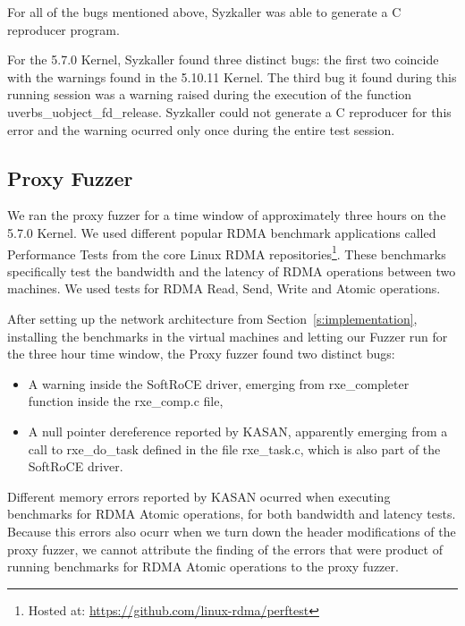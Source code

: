 For all of the bugs mentioned above, Syzkaller was able to generate a C reproducer program.

For the 5.7.0 Kernel, Syzkaller found three distinct bugs: the first two coincide with the warnings found in the 5.10.11 Kernel.
The third bug it found during this running session was a warning raised during the execution of the function uverbs\_uobject\_fd\_release.
Syzkaller could not generate a C reproducer for this error and the warning ocurred only once during the entire test session.

\subsection{Proxy Fuzzer}

We ran the proxy fuzzer for a time window of approximately three hours on the 5.7.0 Kernel.
We used different popular RDMA benchmark applications called Performance Tests from the core
Linux RDMA repositories\footnote{Hosted at: \url{https://github.com/linux-rdma/perftest}}. These benchmarks
specifically test the bandwidth and the latency of RDMA operations between two machines.
We used tests for RDMA Read, Send, Write and Atomic operations.


After setting up the network architecture from Section~\ref{s:implementation}, installing the benchmarks in the
virtual machines and letting our Fuzzer run for the three hour time window, the Proxy fuzzer found two distinct bugs:

\begin{itemize}
  \item A warning inside the SoftRoCE driver, emerging from rxe\_completer function inside the rxe\_comp.c file,
  \item A null pointer dereference reported by KASAN, apparently emerging from a call to rxe\_do\_task defined in the file rxe\_task.c, which is also part of the SoftRoCE driver.
\end{itemize}

Different memory errors reported by KASAN ocurred when executing benchmarks
for RDMA Atomic operations, for both bandwidth and latency tests.
Because this errors also ocurr when we turn down the header modifications
of the proxy fuzzer, we cannot attribute the finding of the errors that
were product of running benchmarks for RDMA Atomic operations to the proxy fuzzer.
